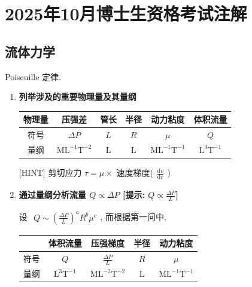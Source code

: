 \documentclass[../../main.tex]{subfiles}
\begin{document}
\section{2025年10月博士生资格考试注解}

\subsection{流体力学}
Poiseuille 定律. 
\begin{enumerate}
    \item \textbf{列举涉及的重要物理量及其量纲}
    
    \begin{table}[h]
    \centering
    \begin{tabular}{|c|c|c|c|c|c|}
    \hline
    物理量 & 压强差 & 管长 & 半径 & 动力粘度 & 体积流量 \\
    \hline
    符号 & $\Delta P$ & $L$ & $R$ & $\mu$ & $Q$ \\
    \hline
    量纲 & $\mathrm{ML^{-1}T^{-2}}$ & $\mathrm{L}$ & $\mathrm{L}$ & $\mathrm{ML^{-1}T^{-1}}$ & $\mathrm{L^{3}T^{-1}}$ \\
    \hline
    \end{tabular}
    \end{table}
    
    [HINT] 剪切应力 $\tau = \mu\times$ 速度梯度($\begin{aligned}\frac{\mathrm{d}v}{\mathrm{d}r}\end{aligned}$) 
    
    \item \textbf{通过量纲分析流量 $Q\propto \Delta P$ [提示: $Q\propto \frac{\Delta P}{L}$]}
    
    设 $\begin{aligned}Q \sim \left(\frac{\Delta P}{L}\right)^{a} R^{b} \mu^{c}\end{aligned}$, 而根据第一问中, 

    \begin{table}[h]
\centering
\begin{tabular}{|c|c|c|c|c|}
\hline
 & 体积流量 & 压强梯度 & 半径 & 动力粘度 \\
\hline
符号 & $Q$ & $\frac{\Delta P}{L}$ & $R$ & $\mu$ \\
\hline
量纲 & $\mathrm{L^{3}T^{-1}}$ & $\mathrm{ML^{-2}T^{-2}}$ & $\mathrm{L}$ & $\mathrm{ML^{-1}T^{-1}}$ \\
\hline
\end{tabular}
\end{table}


\end{enumerate}
\end{document}
